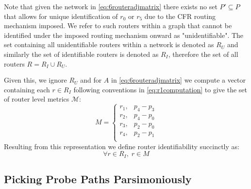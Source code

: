 Note that given the network in \cref{eq:6routeradjmatrix} there exists no set $P' \subseteq P$ that allows for unique identification of $r_0$ or $r_5$ due to the CFR routing mechanism imposed. We refer to such routers within a graph that cannot be identified under the imposed routing mechanism onward as "unidentifiable". The set containing all unidentifiable routers within a network is denoted as $R_U$ and similarly the set of identifiable routers is denoted as $R_I$, therefore the set of all routers $R = R_I\cup R_U$.\par
Given this, we ignore $R_U$ and for $A$ in \cref{eq:6routeradjmatrix} we compute a vector containing each $r \in R_I$ following conventions in \cref{eq:r1computation} to give the set of router level metrics $\mathcal{M}$:
\begin{equation*}
    M = 
    \begin{cases}
    r_1, & p_4-p_3\\
    r_2, & p_4-p_0\\
    r_3, & p_2-p_0\\
    r_4, & p_2-p_1\\
    \end{cases}
\end{equation*}
Resulting from this representation we define router identifiability succinctly as:
\begin{equation}
\label{eq:identifiability}
    \forall r \in R_I,\;r \in M 
\end{equation}

\subsection{Picking Probe Paths Parsimoniously}
\label{ssec:Bparsppselection}

